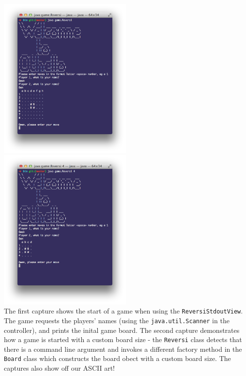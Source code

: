 \documentclass[11pt,a4paper,oneside]{article}
\begin{document}
\noindent
\includegraphics[width=0.5\textwidth]{screenies/gamestart}
\includegraphics[width=0.5\textwidth]{screenies/startsmall}\\

\noindent The first capture shows the start of a game when using the \texttt{ReversiStdoutView}. The game requests the players' names (using the \texttt{java.util.Scanner} in the controller), and prints the inital game board. The second capture demonstrates how a game is started with a custom board size - the \texttt{Reversi} class detects that there is a command line argument and invokes a different factory method in the \texttt{Board} class which constructs the board obect with a custom board size. The captures also show off our ASCII art!
\end{document}

